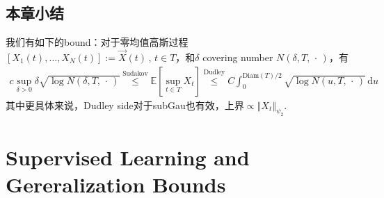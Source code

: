 \documentclass[11pt,a4paper]{ctexart}
\numberwithin{equation}{section}%
\begin{document}
\subsection{本章小结}
我们有如下的bound：对于零均值高斯过程$ [X_1(t),\ldots,X_N(t)]:= \vec{X}(t) \, ,\, t\in T$，和$ \delta  $ covering number $ N(\delta ,T, \, \cdot \, ) $，有
\begin{align*}
    c\sup_{\delta >0}\delta \sqrt{\log N(\delta ,T, \, \cdot \, )} \mathop{ \leq  }\limits^{\text{Sudakov}} \mathbb{E}\left[ \mathop{ \sup  }\limits_{t\in T} X_t  \right] \mathop{ \leq  }\limits^{\text{Dudley}} C\int_0^{\mathrm{ Diam }(T)/2 } \sqrt{\log N(u,T, \, \cdot \, )} \,\mathrm{d}u
\end{align*}
其中更具体来说，Dudley side对于subGau也有效，上界$ \propto \left\Vert X_t  \right\Vert _{\psi_2} $.
















\section{Supervised Learning and Gereralization Bounds}
\end{document}
